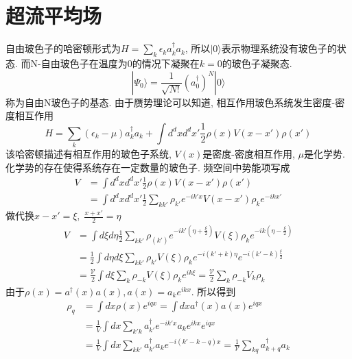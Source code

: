 \documentclass[a4paper,11pt]{article}
\begin{document}
\section{超流平均场}
自由玻色子的哈密顿形式为$H=\sum_{k}\epsilon_k a_k^\dag a_k$, 所以$|0\rangle$表示物理系统没有玻色子的状态. 而N-自由玻色子在温度为0的情况下凝聚在$k=0$的玻色子凝聚态.
\begin{equation*}
  |\Psi_0\rangle=\frac{1}{\sqrt{N!}}(a_0^\dag)^N|0\rangle
\end{equation*}
称为自由N玻色子的基态. 由于赝势理论可以知道, 相互作用玻色系统发生密度-密度相互作用
\begin{equation*}
  H=\sum_{k}(\epsilon_k-\mu)a_k^\dag a_k+\int d^dxd^dx'\frac{1}{2}\rho(x)V(x-x')\rho(x')
\end{equation*}
该哈密顿描述有相互作用的玻色子系统, $V(x)$是密度-密度相互作用, $\mu$是化学势. 化学势的存在使得系统存在一定数量的玻色子. 频空间中势能项写成
\begin{equation*}
  \begin{split}
     V&=\int d^dxd^dx'\frac{1}{2}\rho(x)V(x-x')\rho(x') \\
       &=\int d^dxd^dx'\frac{1}{2}\sum_{kk'}\rho_{k'}e^{-ik'x}V(x-x')\rho_ke^{-ikx'}
  \end{split}
\end{equation*}
做代换$x-x'=\xi,\;\frac{x+x'}{2}=\eta$
\begin{equation*}
  \begin{split}
     V&=\int d\xi d\eta\frac{1}{2}\sum_{kk'}\rho_(k')e^{-ik'(\eta+\frac{\xi}{2})}V(\xi)\rho_{k}e^{-ik(\eta-\frac{\xi}{2})} \\
       &=\frac{1}{2}\int d\eta d\xi\sum_{kk'}\rho_{k'}V(\xi)\rho_{k}e^{-i(k'+k)\eta}e^{-i(k'-k)\frac{\xi}{2}} \\
       &=\frac{\mathcal{V}}{2}\int d\xi\sum_{k}\rho_{-k}V(\xi)\rho_k e^{ik\xi}=\frac{\mathcal{V}}{2}\sum_{k}\rho_{-k}V_{k}\rho_k
  \end{split}
\end{equation*}
由于$\rho(x)=a^\dag(x)a(x), a(x)=a_ke^{ikx}$. 所以得到
\begin{equation*}
  \begin{split}
     \rho_q&=\int dx\rho(x)e^{iqx}=\int dx a^\dag(x)a(x)e^{iqx} \\
       &=\frac{1}{V}\int dx\sum_{k'k}a^\dag_{k'}e^{-ik'x}a_ke^{ikx}e^{iqx} \\
       &=\frac{1}{V}\int dx\sum_{kk'}a^\dag_{k'}a_ke^{-i(k'-k-q)x}=\frac{1}{\mathcal{V}}\sum_{kq}a^\dag_{k+q}a_{k}
  \end{split}
\end{equation*}
\end{document}
